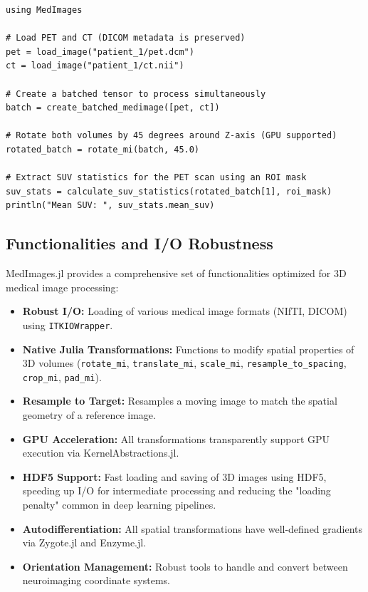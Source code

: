 \documentclass[10pt,letterpaper]{article}
\begin{document}
\begin{lstlisting}[basicstyle=\ttfamily\footnotesize]
using MedImages

# Load PET and CT (DICOM metadata is preserved)
pet = load_image("patient_1/pet.dcm")
ct = load_image("patient_1/ct.nii")

# Create a batched tensor to process simultaneously
batch = create_batched_medimage([pet, ct])

# Rotate both volumes by 45 degrees around Z-axis (GPU supported)
rotated_batch = rotate_mi(batch, 45.0)

# Extract SUV statistics for the PET scan using an ROI mask
suv_stats = calculate_suv_statistics(rotated_batch[1], roi_mask)
println("Mean SUV: ", suv_stats.mean_suv)
\end{lstlisting}

\subsection{Functionalities and I/O Robustness}
MedImages.jl provides a comprehensive set of functionalities optimized for 3D medical image processing:
\begin{itemize}
    \item \textbf{Robust I/O:} Loading of various medical image formats (NIfTI, DICOM) using \texttt{ITKIOWrapper}.
    \item \textbf{Native Julia Transformations:} Functions to modify spatial properties of 3D volumes (\texttt{rotate\_mi}, \texttt{translate\_mi}, \texttt{scale\_mi}, \texttt{resample\_to\_spacing}, \texttt{crop\_mi}, \texttt{pad\_mi}).
    \item \textbf{Resample to Target:} Resamples a moving image to match the spatial geometry of a reference image.
    \item \textbf{GPU Acceleration:} All transformations transparently support GPU execution via KernelAbstractions.jl.
    \item \textbf{HDF5 Support:} Fast loading and saving of 3D images using HDF5, speeding up I/O for intermediate processing and reducing the "loading penalty" common in deep learning pipelines.
    \item \textbf{Autodifferentiation:} All spatial transformations have well-defined gradients via Zygote.jl and Enzyme.jl.
    \item \textbf{Orientation Management:} Robust tools to handle and convert between neuroimaging coordinate systems.
\end{itemize}
\end{document}
